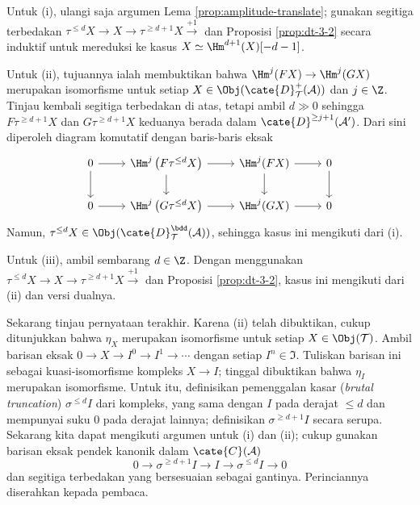 \begin{bukti}
	Untuk (i), ulangi saja argumen Lema \ref{prop:amplitude-translate}; gunakan
	segitiga terbedakan
	$\tau^{\leq d} X \to X \to \tau^{\geq d+1} X \xrightarrow{+1}$ dan
	Proposisi \ref{prop:dt-3-2} secara induktif untuk mereduksi ke kasus
	$X \simeq \Hm^{d+1}(X)[-d-1]$.
	
	Untuk (ii), tujuannya ialah membuktikan bahwa
	$\Hm^j(FX) \to \Hm^j(GX)$ merupakan isomorfisme untuk setiap
	$X \in \Obj(\cate{D}^+_{\mathcal{T}}(\mathcal{A}))$ dan $j \in \Z$.
	Tinjau kembali segitiga terbedakan di atas, tetapi ambil $d \gg 0$ sehingga
	$F\tau^{\geq d+1} X$ dan $G\tau^{\geq d+1} X$ keduanya berada dalam
	$\cate{D}^{\geq j+1}(\mathcal{A}')$. Dari sini diperoleh diagram komutatif
	dengan baris-baris eksak
	\[\begin{tikzcd}
		0 \arrow[r] \arrow[d] & \Hm^j\left( F\tau^{\leq d} X \right) \arrow[r] \arrow[d] & \Hm^j(FX) \arrow[d] \arrow[r] & 0 \arrow[d] \\
		0 \arrow[r] & \Hm^j\left( G\tau^{\leq d} X \right) \arrow[r] & \Hm^j(GX) \arrow[r] & 0
	\end{tikzcd}\]
	Namun,
	$\tau^{\leq d} X \in \Obj(\cate{D}^{\bdd}_{\mathcal{T}}(\mathcal{A}))$,
	sehingga kasus ini mengikuti dari (i).

	Untuk (iii), ambil sembarang $d \in \Z$. Dengan menggunakan
	$\tau^{\leq d} X \to X \to \tau^{\geq d+1} X \xrightarrow{+1}$ dan
	Proposisi \ref{prop:dt-3-2}, kasus ini mengikuti dari (ii) dan versi dualnya.
	
	Sekarang tinjau pernyataan terakhir. Karena (ii) telah dibuktikan, cukup
	ditunjukkan bahwa $\eta_X$ merupakan isomorfisme untuk setiap
	$X \in \Obj(\mathcal{T})$. Ambil barisan eksak
	$0 \to X \to I^0 \to I^1 \to \cdots$ dengan setiap
	$I^n \in \mathfrak{I}$. Tuliskan barisan ini sebagai kuasi-isomorfisme
	kompleks $X \to I$; tinggal dibuktikan bahwa $\eta_I$ merupakan
	isomorfisme. Untuk itu, definisikan pemenggalan kasar
	(\emph{brutal truncation}) $\sigma^{\leq d} I$ dari kompleks, yang sama
	dengan $I$ pada derajat $\leq d$ dan mempunyai suku $0$ pada derajat lainnya;
	definisikan $\sigma^{\geq d+1} I$ secara serupa. Sekarang kita dapat
	mengikuti argumen untuk (i) dan (ii); cukup gunakan barisan eksak
	pendek kanonik dalam $\cate{C}(\mathcal{A})$
	\[ 0 \to \sigma^{\geq d+1} I \to I \to \sigma^{\leq d} I \to 0 \]
	dan segitiga terbedakan yang bersesuaian sebagai gantinya. Perinciannya
	diserahkan kepada pembaca.
\end{bukti}

